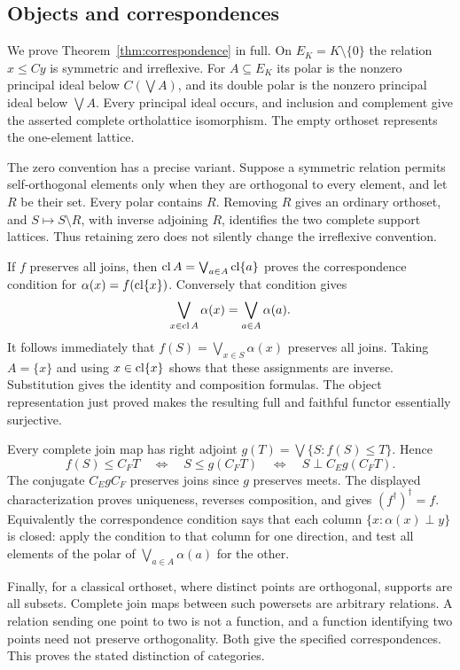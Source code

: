 \subsection{Objects and correspondences}
We prove Theorem~\ref{thm:correspondence} in full. On
$E_K=K\setminus\{0\}$ the relation $x\le Cy$ is symmetric and
irreflexive. For $A\subseteq E_K$ its polar is the nonzero
principal ideal below $C(\bigvee A)$, and its double polar is the
nonzero principal ideal below $\bigvee A$. Every principal ideal
occurs, and inclusion and complement give the asserted complete
ortholattice isomorphism. The empty orthoset represents the
one-element lattice.

The zero convention has a precise variant. Suppose a symmetric
relation permits self-orthogonal elements only when they are
orthogonal to every element, and let $R$ be their set. Every polar
contains $R$. Removing $R$ gives an ordinary orthoset, and
$S\mapsto S\setminus R$, with inverse adjoining $R$, identifies
the two complete support lattices. Thus retaining zero does not
silently change the irreflexive convention.

If $f$ preserves all joins, then
$\operatorname{cl} A=\bigvee_{a\in A}\operatorname{cl}\{a\}$ proves the correspondence
condition for $\alpha(x)=f(\operatorname{cl}\{x\})$. Conversely that condition
gives
\[
 \bigvee_{x\in\operatorname{cl} A}\alpha(x)=\bigvee_{a\in A}\alpha(a).
\]
It follows immediately that $f(S)=\bigvee_{x\in S}\alpha(x)$
preserves all joins. Taking $A=\{x\}$ and using
$x\in\operatorname{cl}\{x\}$ shows that these assignments are inverse.
Substitution gives the identity and composition formulas.
The object representation just proved makes the resulting
full and faithful functor essentially surjective.

Every complete join map has right adjoint
$g(T)=\bigvee\{S:f(S)\le T\}$. Hence
\[
 f(S)\le C_FT\quad\Longleftrightarrow\quad
 S\le g(C_FT)\quad\Longleftrightarrow\quad
 S\perp C_Eg(C_FT).
\]
The conjugate $C_EgC_F$ preserves joins since $g$ preserves meets.
The displayed characterization proves uniqueness, reverses
composition, and gives $(f^\dagger)^\dagger=f$.
Equivalently the correspondence condition says that each column
$\{x:\alpha(x)\perp y\}$ is closed: apply the condition to
that column for one direction, and test all elements of the
polar of $\bigvee_{a\in A}\alpha(a)$ for the other.

Finally, for a classical orthoset, where distinct points are
orthogonal, supports are all subsets. Complete join maps between
such powersets are arbitrary relations. A relation sending one
point to two is not a function, and a function identifying two
points need not preserve orthogonality. Both give the specified
correspondences. This proves the stated distinction of categories.
